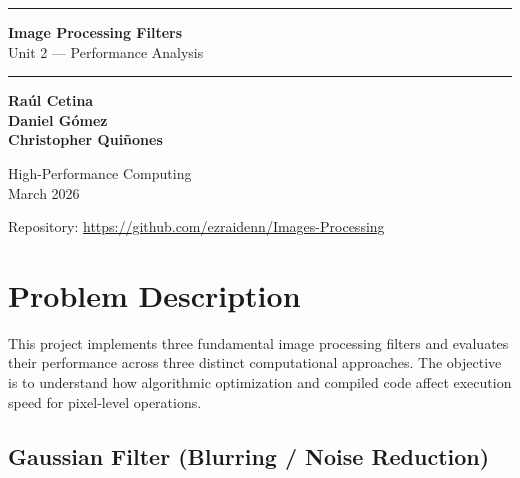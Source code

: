 \documentclass[12pt, a4paper]{article}
\begin{document}
\begin{titlepage}
    \centering
    \vspace*{3cm}

    {\color{accent}\rule{\textwidth}{1.5pt}}
    \vspace{0.8cm}

    {\Huge\bfseries\color{primary} Image Processing Filters}\\[0.4cm]
    {\LARGE\color{subtle} Unit 2 --- Performance Analysis}

    \vspace{0.8cm}
    {\color{accent}\rule{\textwidth}{1.5pt}}

    \vspace{2cm}

    {\large\color{primary}
    \textbf{Ra\'ul Cetina}\\[0.2cm]
    \textbf{Daniel G\'omez}\\[0.2cm]
    \textbf{Christopher Qui\~nones}
    }

    \vspace{2cm}

    {\color{subtle}\large High-Performance Computing}\\[0.3cm]
    {\color{subtle}\normalsize March 2026}

    \vfill
    {\footnotesize\color{subtle} Repository: \url{https://github.com/ezraidenn/Images-Processing}}
\end{titlepage}

\tableofcontents
\newpage

\section{Problem Description}

This project implements three fundamental image processing filters and evaluates their performance across three distinct computational approaches. The objective is to understand how algorithmic optimization and compiled code affect execution speed for pixel-level operations.

\subsection{Gaussian Filter (Blurring / Noise Reduction)}
\end{document}
